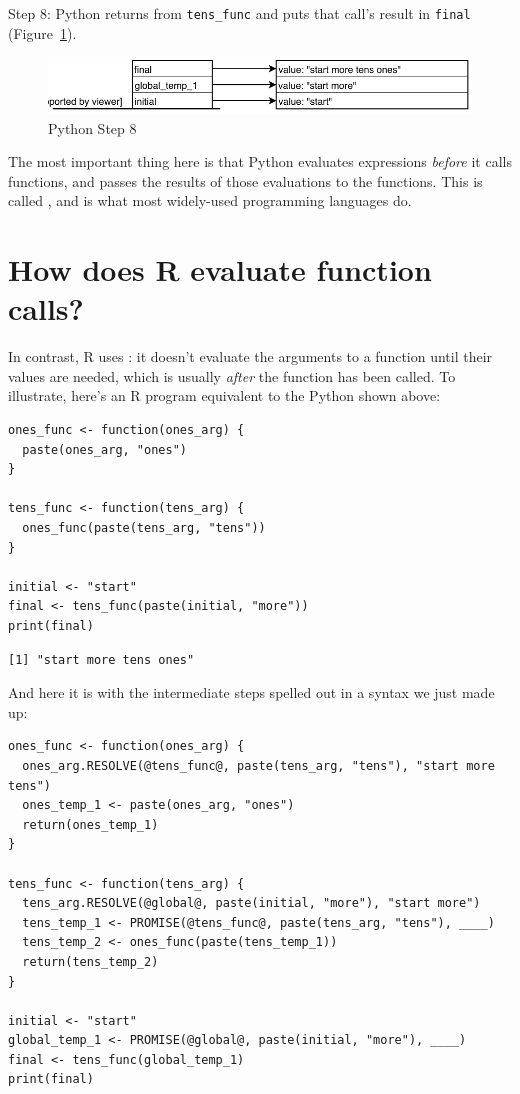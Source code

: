 Step 8: Python returns from \texttt{tens\_func}
and puts that call's result in \texttt{final}
(Figure~\ref{fig:py-step-8}).

\begin{figure}[h]
  \includegraphics{figures/nse/python-step-08.pdf}
  \caption{Python Step 8}
  \label{fig:py-step-8}
\end{figure}

The most important thing here is that
Python evaluates expressions \emph{before} it calls functions,
and passes the results of those evaluations to the functions.
This is called ,
and is what most widely-used programming languages do.

\section{How does R evaluate function calls?}

In contrast,
R uses :
it doesn't evaluate the arguments to a function until their values are needed,
which is usually \emph{after} the function has been called.
To illustrate,
here's an R program equivalent to the Python shown above:

\begin{lstlisting}
ones_func <- function(ones_arg) {
  paste(ones_arg, "ones")
}

tens_func <- function(tens_arg) {
  ones_func(paste(tens_arg, "tens"))
}

initial <- "start"
final <- tens_func(paste(initial, "more"))
print(final)
\end{lstlisting}

\begin{lstlisting}
[1] "start more tens ones"
\end{lstlisting}

And here it is with the intermediate steps spelled out in a syntax we just made up:

\begin{lstlisting}
ones_func <- function(ones_arg) {
  ones_arg.RESOLVE(@tens_func@, paste(tens_arg, "tens"), "start more tens")
  ones_temp_1 <- paste(ones_arg, "ones")
  return(ones_temp_1)
}

tens_func <- function(tens_arg) {
  tens_arg.RESOLVE(@global@, paste(initial, "more"), "start more")
  tens_temp_1 <- PROMISE(@tens_func@, paste(tens_arg, "tens"), ____)
  tens_temp_2 <- ones_func(paste(tens_temp_1))
  return(tens_temp_2)
}

initial <- "start"
global_temp_1 <- PROMISE(@global@, paste(initial, "more"), ____)
final <- tens_func(global_temp_1)
print(final)
\end{lstlisting}

